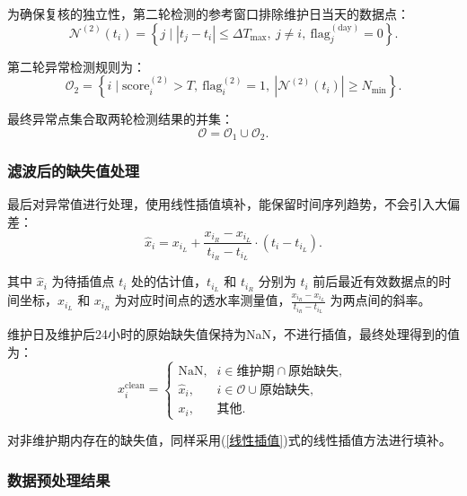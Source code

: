 \documentclass[withoutpreface,bwprint]{cumcmthesis}
\begin{document}
为确保复核的独立性，第二轮检测的参考窗口排除维护日当天的数据点：
\begin{equation}
	\mathcal{N}^{(2)}(t_i) = \left\{ j \mid |t_j - t_i| \leq \Delta T_{\max},\ j \neq i,\ \text{flag}_j^{(\text{day})} = 0 \right\}.
\end{equation}

第二轮异常检测规则为：
\begin{equation}
	\mathcal{O}_2 = \left\{ i \mid \text{score}_i^{(2)} > T,\ \text{flag}_i^{(2)} = 1,\ |\mathcal{N}^{(2)}(t_i)| \geq N_{\min} \right\}.
\end{equation}

最终异常点集合取两轮检测结果的并集：
\begin{equation}
	\mathcal{O} = \mathcal{O}_1 \cup \mathcal{O}_2.
\end{equation}

\subsubsection{滤波后的缺失值处理}

最后对异常值进行处理，使用线性插值填补，能保留时间序列趋势，不会引入大偏差：
\begin{equation}
	\hat{x}_i = x_{i_L} + \frac{x_{i_R} - x_{i_L}}{t_{i_R} - t_{i_L}} \cdot (t_i - t_{i_L}).
	\label{线性插值}
\end{equation}

其中 $\hat{x}_i$ 为待插值点 $t_i$ 处的估计值，$t_{i_L}$ 和 $t_{i_R}$ 分别为 $t_i$ 前后最近有效数据点的时间坐标，$x_{i_L}$ 和 $x_{i_R}$ 为对应时间点的透水率测量值，$\frac{x_{i_R} - x_{i_L}}{t_{i_R} - t_{i_L}}$ 为两点间的斜率。

维护日及维护后24小时的原始缺失值保持为NaN，不进行插值，最终处理得到的值为：
\begin{equation}
	x_i^{\text{clean}} =
	\begin{cases}
		\text{NaN}, & i \in \text{维护期} \cap \text{原始缺失}, \\
		\hat{x}_i, & i \in \mathcal{O} \cup \text{原始缺失}, \\
		x_i, & \text{其他}.
	\end{cases}
\end{equation}

对非维护期内存在的缺失值，同样采用(\ref{线性插值})式的线性插值方法进行填补。

\subsubsection{数据预处理结果}
\end{document}
